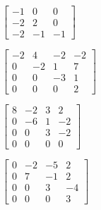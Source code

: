 \begin{exercise}
\begin{Parts}
\begin{OmitV1}
\item \(\begin{bmatrix} -1 & 0 & 0
\\-2 & 2 & 0
\\-2 & -1 & -1 \end{bmatrix}\)

\item \(\begin{bmatrix} -2 & 4 & -2 & -2
\\0 & -2 & 1 & 7
\\0 & 0 & -3 & 1
\\0 & 0 & 0 & 2 \end{bmatrix}\)
\end{OmitV1}

\item \(\begin{bmatrix} 8 & -2 & 3 & 2
\\0 & -6 & 1 & -2
\\0 & 0 & 3 & -2
\\0 & 0 & 0 & 0 \end{bmatrix}\)

\item \(\begin{bmatrix} 0 & -2 & -5 & 2
\\0 & 7 & -1 & 2
\\0 & 0 & 3 & -4
\\0 & 0 & 0 & 3 \end{bmatrix}\)

\end{Parts}
\end{exercise}







%
%
%
%

\endinput

